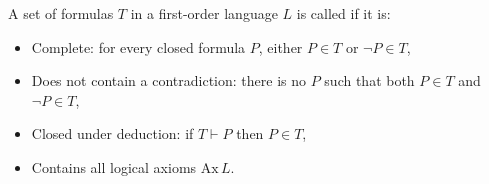 A set of formulas $T$ in a first-order language $L$ is called  if it is:
\begin{itemize}
\item Complete: for every closed formula $P$, either $P \in T$ or $\neg P \in T$,
\item Does not contain a contradiction: there is no $P$ such that both $P \in T$ and $\neg P \in T$,
\item Closed under deduction: if $T \vdash P$ then $P \in T$,
\item Contains all logical axioms $\mathrm{Ax}\,L$.
\end{itemize}
